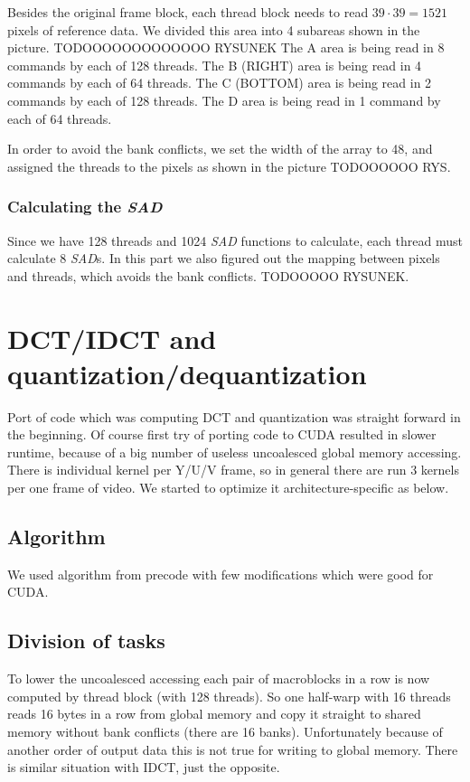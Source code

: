 \documentclass[11pt]{article}
\begin{document}
Besides the original frame block, each thread block needs to read 
$39 \cdot 39 = 1521$ pixels of reference data. We divided this area into
4 subareas shown in the picture. 
TODOOOOOOOOOOOOO RYSUNEK
The A area is being read in 8 commands by each of 128 threads.
The B (RIGHT) area is being read in 4 commands by each of 64 threads.
The C (BOTTOM) area is being read in 2 commands by each of 128 threads.
The D area is being read in 1 command by each of 64 threads.

In order to avoid the bank conflicts, we set the width of the array to 48,
and assigned the threads to the pixels as shown in the picture TODOOOOOO RYS.

\subsubsection{Calculating the \emph{SAD}}
Since we have 128 threads and 1024 \emph{SAD} functions to calculate, each
thread must calculate 8 \emph{SAD}s. In this part we also figured out the
mapping between pixels and threads, which avoids the bank conflicts.
TODOOOOO RYSUNEK.

\section{DCT/IDCT and quantization/dequantization}
Port of code which was computing DCT and quantization was straight forward in the beginning. Of course first try of porting code to CUDA resulted in slower runtime, because of a big number of useless uncoalesced global memory accessing. There is individual kernel per Y/U/V frame, so in general there are run 3 kernels per one frame of video. We started to optimize it architecture-specific as below.
\subsection{Algorithm}
We used algorithm from precode with few modifications which were good for CUDA.
\subsection{Division of tasks}
To lower the uncoalesced accessing each pair of macroblocks in a row is now computed by thread block (with 128 threads). So one half-warp with 16 threads reads 16 bytes in a row from global memory and copy it straight to shared memory without bank conflicts (there are 16 banks). Unfortunately because of another order of output data this is not true for writing to global memory. There is similar situation with IDCT, just the opposite.
\end{document}
